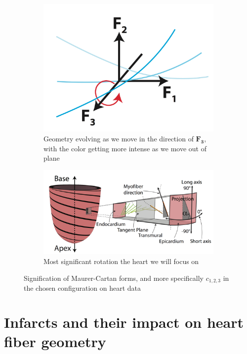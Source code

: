 \begin{figure}[h]
    \centering
    \begin{subfigure}[t]{.48\textwidth}
        \includegraphics[width=\textwidth]{figures/c123}
        \caption[b]{Geometry evolving as we move in the direction of $\mathbf{F_3}$, with the color getting more intense as we move out of plane}
        \label{fig:c123}
    \end{subfigure}
    \begin{subfigure}[t]{.48\textwidth}
        \includegraphics[width=\textwidth]{figures/helix_angle}
        \caption{Most significant rotation the heart we will focus on}
        \label{fig:helix_angle}
    \end{subfigure}
    \caption{Signification of Maurer-Cartan forms, and more specifically $c_{1,2,3}$ in the chosen configuration on heart data}
\end{figure}

\section{Infarcts and their impact on heart fiber geometry}

